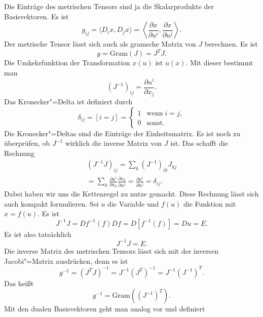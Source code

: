 \documentclass[a4paper,11pt,fleqn,twocolumn,twoside]{scrartcl}
\numberwithin{equation}{section}
\begin{document}
Die Einträge des metrischen Tensors sind ja die Skalarprodukte der
Basisvektoren. Es ist
\begin{equation}
g_{ij} = \langle D_i x, D_j x\rangle
=  \left\langle \frac{\partial x}{\partial u^i},
\frac{\partial x}{\partial u^j}\right\rangle.
\end{equation}
Der metrische Tensor lässt sich auch als gramsche Matrix von $J$
berechnen. Es ist
\begin{equation}
g = \mathrm{Gram}(J) = J^T\!J.
\end{equation}
Die Umkehrfunktion der Transformation $x(u)$ ist $u(x)$.
Mit dieser bestimmt man
\begin{equation}
(J^{-1})_{ij} = \frac{\partial u^i}{\partial x_j}.
\end{equation}
Das Kronecker"=Delta ist definiert durch
\begin{equation}
\delta_{ij} = [i=j]
= \begin{cases}
1 & \mathrm{wenn}\;i=j,\\
0 & \mathrm{sonst}.
\end{cases}
\end{equation}
Die Kronecker"=Deltas sind die Einträge der Einheitsmatrix.
Es ist noch zu überprüfen, ob $J^{-1}$ wirklich die inverse Matrix
von $J$ ist. Das schafft die Rechnung
\begin{gather*}
(J^{-1}J)_{ij} = \sum_{k}(J^{-1})_{ik}J_{kj}\\
= \sum_{k} \frac{\partial u^i}{\partial x_k}
\frac{\partial x_k}{\partial u^j}
= \frac{\partial u^i}{\partial u^j}
= \delta_{ij}.
\end{gather*}
Dabei haben wir uns die Kettenregel zu nutze gemacht. Diese Rechnung
lässt sich auch kompakt formulieren. Sei $u$ die Variable und
$f(u)$ die Funktion mit $x=f(u)$. Es ist
\begin{equation}
J^{-1}J = Df^{-1}(f)Df = D[f^{-1}(f)] = Du = E.
\end{equation}
Es ist also tatsächlich
\begin{equation}
J^{-1}J = E.
\end{equation}
Die inverse Matrix des metrischen Tensors lässt sich mit der inversen
Jacobi"=Matrix ausdrücken, denn es ist
\begin{equation}
g^{-1} = (J^T\!J)^{-1} = J^{-1}(J^T)^{-1} = J^{-1}(J^{-1})^T.
\end{equation}
Das heißt
\begin{equation}
g^{-1} = \mathrm{Gram}((J^{-1})^T).
\end{equation}
%
Mit den dualen Basisvektoren geht man analog vor und definiert
\end{document}
